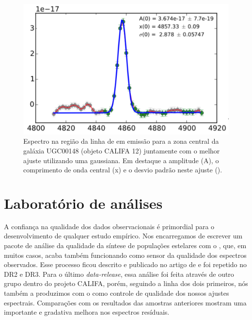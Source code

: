 \begin{figure}
	\centering
	\includegraphics[scale=0.4]{figuras/K0012-zone0-Hb.pdf}
	\caption[Exemplo de ajuste de linha de emissão]
	{Espectro na região da linha de \Hbeta em emissão para a zona central da galáxia UGC00148 (objeto
CALIFA 12) juntamente com o melhor ajuste utilizando uma gaussiana. Em destaque a amplitude (A), o
comprimento de onda central (x) e o desvio padrão neste ajuste (\sigma).}
	\label{fig:rgbline}
\end{figure}


 \section{Laboratório de análises}
\label{sec:sample:definicao}

A confiança na qualidade dos dados observacionais é primordial para o desenvolvimento de qualquer estudo empírico. Nos encarregamos de escrever um pacote de análise da qualidade da síntese de populações estelares com o \starlight, que, em muitos casos, acaba também funcionando como sensor da qualidade dos espectros observados. Esse processo ficou descrito e publicado no artigo de \citet[][DR1]{Husemann.etal.2013a} e foi repetido no DR2 e DR3. Para o último {\em data-release}, essa análise foi feita através de outro grupo dentro do projeto CALIFA, porém, seguindo a linha dos dois primeiros, nós também a produzimos com o \starlight como controle de qualidade dos nossos ajustes espectrais. Comparações com os resultados das amostras anteriores mostram uma importante e gradativa melhora nos espectros resíduais.

